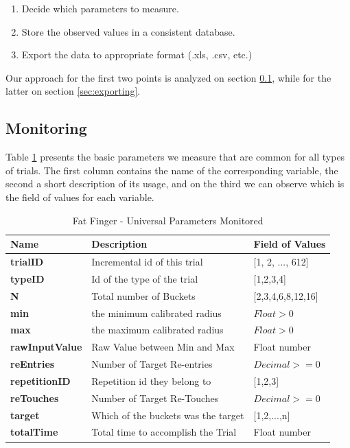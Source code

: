 \begin{enumerate}
	\item Decide which parameters to measure.
	\item Store the observed values in a consistent database.
	\item Export the data to appropriate format (.xls, .csv, etc.)
\end{enumerate}

Our approach for the first two points is analyzed on section \ref{sec:monitoring}, while for the latter on section \ref{sec:exporting}.
\subsection{Monitoring}
\label{sec:monitoring}

Table \ref{tab:ffUniData} presents the basic parameters we measure that are common for all types of trials. The first column contains the name of the corresponding variable, the second a short description of its usage, and on the third we can observe which is the field of values for each variable.


\begin{table}[H]
\centering
\begin{tabular}{l || l || l}
Name & Description & Field of Values\\
\hline \hline
\textbf{trialID} & Incremental id of this trial & [1, 2, ..., 612] \\
\textbf{typeID} & Id of the type of the trial & [1,2,3,4] \\
\textbf{N} & Total number of Buckets & [2,3,4,6,8,12,16] \\
\textbf{min} & the minimum calibrated radius & $Float > 0$ \\
\textbf{max} & the maximum calibrated radius & $Float > 0$ \\
\textbf{rawInputValue} & Raw Value between Min and Max & Float number \\
\textbf{reEntries} & Number of Target Re-entries & $Decimal >= 0$ \\
\textbf{repetitionID} & Repetition id they belong to & [1,2,3] \\
\textbf{reTouches} & Number of Target Re-Touches & $Decimal >= 0$ \\
\textbf{target} & Which of the buckets was the target  & [1,2,...,n]\\
\textbf{totalTime} & Total time to accomplish the Trial & Float number
\end{tabular}
\caption{Fat Finger - Universal Parameters Monitored}
\label{tab:ffUniData}
\end{table}

